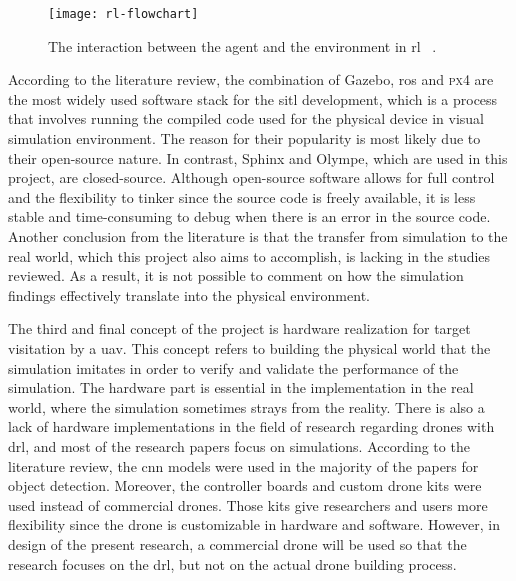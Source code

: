 \documentclass[../main.tex]{subfiles}
\begin{document}
\begin{figure}[tb] 
    \centering
    \texttt{[image: rl-flowchart]} 
    \caption[The interaction between the agent and the
        environment in \gls{rl}.]
    {The interaction between the agent and the
        environment in \gls{rl}%
        ~\cite[Fig.~3.1]{Sut20}.} 
    \label{fig:rl-flowchart} 
\end{figure}

According to the literature review, 
the combination of Gazebo, \gls{ros}
and \textsc{px4} are the most widely used software stack 
for the \gls{sitl} development,
which is a process that involves running the compiled code
used for the physical device in visual simulation environment.
The reason for their popularity is most likely 
due to their open-source nature. 
In contrast, Sphinx and Olympe, which are used in this project, 
are closed-source.
Although open-source software 
allows for full control and the flexibility to tinker
since the source code is freely available,
it is less stable and time-consuming to debug
when there is an error in the source code.
Another conclusion from the literature is that 
the transfer from simulation to the real world,
which this project also aims to accomplish,
is lacking in the studies reviewed.
As a result, it is not possible to comment on 
how the simulation findings effectively translate
into the physical environment.

The third and final concept of the project 
is hardware realization for target visitation by a \gls{uav}.
This concept refers to building the physical world
that the simulation imitates in order to 
verify and validate the performance of the simulation.
The hardware part is essential in the implementation 
in the real world, where the simulation 
sometimes strays from the reality.
There is also a lack of hardware implementations in 
the field of research regarding drones with \gls{drl}, 
and most of the research papers focus on simulations.
According to the literature review, the \gls{cnn} 
models were used in the majority of the papers for object detection. 
Moreover, the controller boards and custom drone kits 
were used instead of commercial drones.
Those kits give researchers and users more flexibility 
since the drone is customizable 
in hardware and software. 
However, in design of the present research, 
a commercial drone will be used so that the research focuses 
on the \gls{drl}, but not on the actual drone building process. 
 
\end{document}
